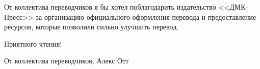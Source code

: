 От коллектива переводчиков я бы хотел поблагодарить издательство <<ДМК-Пресс>> за
организацию официального оформления перевода и предоставление ресурсов, которые позволили
сильно улучшить перевод.

\vspace{1em}

Приятного чтения!

\begin{flushright}
  От коллектива переводчиков, Алекс Отт
\end{flushright}

